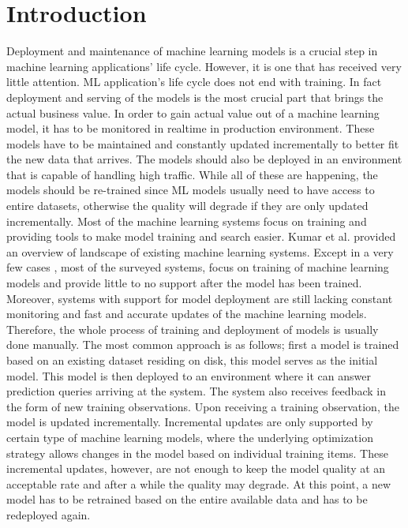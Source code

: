 \documentclass{sig-alternate-05-2015}
\begin{document}
\section{Introduction} \label{introduction}
Deployment and maintenance of machine learning models is a crucial step in machine learning applications' life cycle. 
However, it is one that has received very little attention. 
ML application's life cycle does not end with training. 
In fact deployment and serving of the models is the most crucial part that brings the actual business value. 
In order to gain actual value out of a machine learning model, it has to be monitored in realtime in production environment. 
These models have to be maintained and constantly updated incrementally to better fit the new data that arrives. 
The models should also be deployed in an environment that is capable of handling high traffic. 
While all of these are happening, the models should be re-trained since ML models usually need to have access to entire datasets, otherwise the quality will degrade if they are only updated incrementally.
Most of the machine learning systems focus on training and providing tools to make model training and search easier. 
Kumar et al. \cite{kumar2015survey} provided an overview of landscape of existing machine learning systems. 
Except in a very few cases \cite{akdere2011case, crankshaw2014missing}, most of the surveyed systems, focus on training of machine learning models and provide little to no support after the model has been trained.
Moreover, systems with support for model deployment are still lacking constant monitoring and fast and accurate updates of the machine learning models.
Therefore, the whole process of training and deployment of models is usually done manually.
The most common approach is as follows; first a model is trained based on an existing dataset residing on disk, this model serves as the initial model.
This model is then deployed to an environment where it can answer prediction queries arriving at the system.
The system also receives feedback in the form of new training observations.
Upon receiving a training observation, the model is updated incrementally.
Incremental updates are only supported by certain type of machine learning models, where the underlying optimization strategy allows changes in the model based on individual training items.
These incremental updates, however, are not enough to keep the model quality at an acceptable rate and after a while the quality may degrade.
At this point, a new model has to be retrained based on the entire available data and has to be redeployed again.
\end{document}
